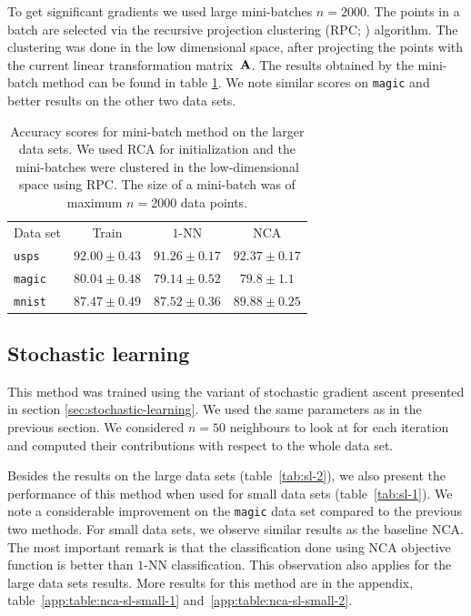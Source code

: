     To get significant gradients we used large mini-batches $n=2000$. The points in a batch are selected via the recursive projection clustering (RPC; \citealp{chalupka2011}) algorithm. The clustering was done in the low dimensional space, after projecting the points with the current linear transformation matrix~$\mathbf{A}$.
    The results obtained by the mini-batch method can be found in table \ref{tab:mb}. We note similar scores on \texttt{magic} and better results on the other two data sets.

    \begin{table}
        	\centering
        	\begin{tabular}{lccc}
        	\toprule
        	Data set & Train & $1$-NN & NCA \\
        	\cmidrule(r){2-2}\cmidrule(r){3-4}
        	 \texttt{usps}&$92.00 \pm 0.43$&$91.26 \pm 0.17$&$92.37 \pm 0.17$\\
        	 \texttt{magic}&$80.04 \pm 0.48$&$79.14 \pm 0.52$&$79.8 \pm 1.1$\\
        	 \texttt{mnist}&$87.47 \pm 0.49$&$87.52 \pm 0.36$&$89.88 \pm 0.25$\\
        	 \bottomrule
        	\end{tabular}
		\caption[Accuracy for the mini-batch method on large data sets]{Accuracy scores for mini-batch method on the larger data sets. We used RCA for initialization and the mini-batches were clustered in the low-dimensional space using RPC. The size of a mini-batch was of maximum $n=2000$ data points.}
		\label{tab:mb}
    \end{table}

    \subsection{Stochastic learning}
    \label{subsec:eval-stochastic-learning}

    This method was trained using the variant of stochastic gradient ascent presented in section \ref{sec:stochastic-learning}. We used the same parameters as in the previous section. We considered $n=50$ neighbours to look at for each iteration and computed their contributions with respect to the whole data set. 

    Besides the results on the large data sets (table~\ref{tab:sl-2}), we also present the performance of this method when used for small data sets (table~\ref{tab:sl-1}). We note a considerable improvement on the \texttt{magic} data set compared to the previous two methods. For small data sets, we observe similar results as the baseline NCA. The most important remark is that the classification done using NCA objective function is better than $1$-NN classification. This observation also applies for the large data sets results. More results for this method are in the appendix, table~\ref{app:table:nca-sl-small-1} and~\ref{app:table:nca-sl-small-2}.

